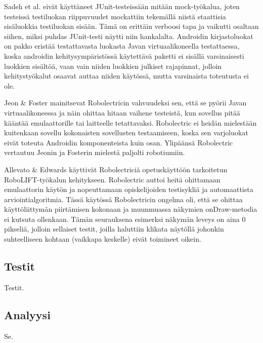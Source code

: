 Sadeh et al. eivät käyttäneet JUnit-testeissään mitään mock-työkalua, joten testeissä testiluokan riippuvuudet mockattiin tekemällä niistä staattisia sisäluokkia testiluokan sisään. Tämä on erittäin verboosi tapa ja vaikutti osaltaan siihen, miksi puhdas JUnit-testi näytti niin hankalalta. Androidin kirjastoluokat on pakko eristää testattavasta luokasta Javan virtuaalikoneella testattaessa, koska androidin kehitysympäristössä käytettävä paketti ei sisällä varsinaisesti luokkien sisältöä, vaan vain niiden luokkien julkiset rajapinnat, jolloin kehitystyökalut osaavat auttaa niiden käytössä, mutta varsinaista toteutusta ei ole.

Jeon \& Foster mainitsevat Robolectricin vahvuudeksi sen, että se pyörii Javan virtuaalikoneessa ja näin ohittaa hitaan vaihene testeistä, kun sovellus pitää kääntää emulaattorille tai laitteelle tetattavaksi. Robolectric ei heidän mielestään kuitenkaan sovellu kokonaisten sovellusten testaamiseen, koska sen varjoluokat eivät toteuta Androidin komponenteista kuin osan. Ylipäänsä Robolectric vertautuu Jeonin ja Fosterin mielestä paljolti robotiumiin. \cite{troyd}

Allevato \& Edwards käyttivät Robolectriciä opetuskäyttöön tarkoitetun RoboLIFT-työkalun kehitykseen. Robolectric auttoi heitä ohittamaan emulaattorin käytön ja nopeuttamaan opiskelijoiden testisykliä ja automaattista arviointialgoritmia. Tässä käytössä Robolectricin ongelma oli, että se ohittaa käyttöliittymän piirtämisen kokonaan ja muunmuassa näkymien onDraw-metodia ei kutsuta ollenkaan. Tämän seurauksena esimerksi näkymän leveys on aina 0 pikseliä, jolloin sellaiset testit, joilla haluttiin klikata näytöllä johonkin suhteelliseen kohtaan (vaikkapa keskelle) eivät toimineet oikein. \cite{robolift}

\subsection{Testit}

Testit.

\subsection{Analyysi}

Se.